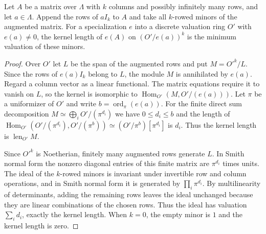 \begin{lemma}
\label{lem:c-selmer-minors-length}
\emitthmsource
Let $A$ be a matrix over $\Lambda$ with $k$ columns and possibly infinitely many rows, and let $a\in\Lambda$.
Append the rows of $a I_k$ to $A$ and take all $k$-rowed minors of the augmented matrix.
For a specialization $e$ into a discrete valuation ring $O'$ with $e(a)\ne0$, the kernel length of $e(A)$ on $(O'/e(a))^k$ is the minimum valuation of these minors.
\end{lemma}
\begin{proof}
Over $O'$ let $L$ be the span of the augmented rows and put $M=O'^k/L$.
Since the rows of $e(a)I_k$ belong to $L$, the module $M$ is annihilated by $e(a)$.
Regard a column vector as a linear functional. The matrix equations require it to vanish on $L$, so the kernel is isomorphic to $\operatorname{Hom}_{O'}(M,O'/(e(a)))$.
Let $\pi$ be a uniformizer of $O'$ and write $b=\operatorname{ord}_\pi(e(a))$.
For the finite direct sum decomposition $M\simeq\bigoplus_i O'/(\pi^{d_i})$ we have $0\le d_i\le b$ and the length of $\operatorname{Hom}_{O'}(O'/(\pi^{d_i}),O'/(\pi^b))\simeq(O'/\pi^b)[\pi^{d_i}]$ is $d_i$.
Thus the kernel length is $\operatorname{len}_{O'} M$.

Since $O'^k$ is Noetherian, finitely many augmented rows generate $L$.
In Smith normal form the nonzero diagonal entries of this finite matrix are $\pi^{d_i}$ times units.
The ideal of the $k$-rowed minors is invariant under invertible row and column operations, and in Smith normal form it is generated by $\prod_i\pi^{d_i}$.
By multilinearity of determinants, adding the remaining rows leaves the ideal unchanged because they are linear combinations of the chosen rows.
Thus the ideal has valuation $\sum_i d_i$, exactly the kernel length.
When $k=0$, the empty minor is $1$ and the kernel length is zero.
\end{proof}

